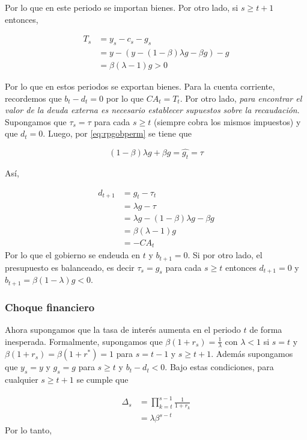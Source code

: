 \documentclass[]{article}
\begin{document}
Por lo que en este periodo se importan bienes. Por otro lado, si
\(s \geq t+1\) entonces,

\[
\begin{align}
T_s &= y_s - c_s - g_s \\
& = y - (y - (1-\beta)\lambda g - \beta g) - g \\
& = \beta(\lambda - 1)g > 0
\end{align}
\]

Por lo que en estos periodos se exportan bienes. Para la cuenta
corriente, recordemos que \(b_t - d_t = 0\) por lo que \(CA_t = T_t\).
Por otro lado, \emph{para encontrar el valor de la deuda externa es
necesario establecer supuestos sobre la recaudación}. Supongamos que
\(\tau_s = \tau\) para cada \(s \geq t\) (siempre cobra los mismos
impuestos) y que \(d_t = 0\). Luego, por \eqref{eq:rpgobperm} se tiene que

\[
(1-\beta)\lambda g + \beta g = \hat{g_t} = \tau
\]

Así,

\[
\begin{align}
d_{t+1} &= g_t - \tau_t \\
&= \lambda g - \tau \\
&= \lambda g -(1-\beta)\lambda g - \beta g \\
&= \beta (\lambda -1) g \\
& = -CA_t
\end{align}
\] Por lo que el gobierno se endeuda en \(t\) y \(b_{t+1} = 0\). Si por
otro lado, el presupuesto es balanceado, es decir \(\tau_s = g_s\) para
cada \(s \geq t\) entonces \(d_{t+1} = 0\) y
\(b_{t+1} = \beta (1- \lambda)g < 0\).

\subsubsection{Choque financiero}\label{choque-financiero}

Ahora supongamos que la tasa de interés aumenta en el periodo \(t\) de
forma inesperada. Formalmente, supongamos que
\(\beta(1+r_s) = \frac{1}{\lambda}\) con \(\lambda < 1\) si \(s = t\) y
\(\beta(1+r_{s}) = \beta(1+r^*)=1\) para \(s = t-1\) y \(s \geq t+1\).
Además supongamos que \(y_s = y\) y \(g_s = g\) para \(s \geq t\) y
\(b_t - d_t < 0\). Bajo estas condiciones, para cualquier \(s \geq t+1\)
se cumple que

\[
\begin{align}
\Delta_s &= \prod_{k  = t} ^{s-1} \frac{1}{1+r_k} \\
&= \lambda \beta^{s-t}
\end{align}
\] Por lo tanto,
\end{document}
